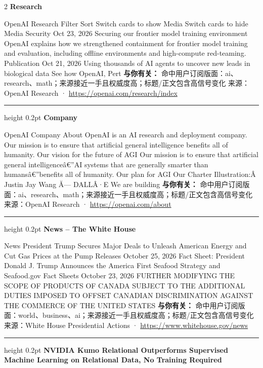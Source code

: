 \documentclass[10.5pt]{ctexart}
\begin{document}
\begin{multicols}{2}
{\large\bfseries Research}\par
OpenAI Research Filter Sort Switch cards to show Media Switch cards to hide Media Security Oct 23, 2026 Securing our frontier model training environment OpenAI explains how we strengthened containment for frontier model training and evaluation, including offline environments and high-compute red-teaming. Publication Oct 21, 2026 Using thousands of AI agents to uncover new leads in biological data See how OpenAI, Pert
\textbf{与你有关：} 命中用户订阅版面：ai、research、math；来源接近一手且权威度高；标题/正文包含高信号变化
{\footnotesize\color{ormuted} 来源：OpenAI Research · \url{https://openai.com/research/index}}
\vspace{2mm}
\hrule height 0.2pt
\vspace{2mm}
{\large\bfseries Company}\par
OpenAI Company About OpenAI is an AI research and deployment company. Our mission is to ensure that artificial general intelligence benefits all of humanity. Our vision for the future of AGI Our mission is to ensure that artificial general intelligenceâ€”AI systems that are generally smarter than humansâ€”benefits all of humanity. Our plan for AGI Our Charter Illustration:Â Justin Jay Wang Ă— DALLÂ·E We are building 
\textbf{与你有关：} 命中用户订阅版面：ai、research、math；来源接近一手且权威度高；标题/正文包含高信号变化
{\footnotesize\color{ormuted} 来源：OpenAI Research · \url{https://openai.com/about}}
\vspace{2mm}
\hrule height 0.2pt
\vspace{2mm}
{\large\bfseries News – The White House}\par
News President Trump Secures Major Deals to Unleash American Energy and Cut Gas Prices at the Pump Releases October 25, 2026 Fact Sheet: President Donald J. Trump Announces the America First Seafood Strategy and Seafood.gov Fact Sheets October 23, 2026 FURTHER MODIFYING THE SCOPE OF PRODUCTS OF CANADA SUBJECT TO THE ADDITIONAL DUTIES IMPOSED TO OFFSET CANADIAN DISCRIMINATION AGAINST THE COMMERCE OF THE UNITED STATES 
\textbf{与你有关：} 命中用户订阅版面：world、business、ai；来源接近一手且权威度高；标题/正文包含高信号变化
{\footnotesize\color{ormuted} 来源：White House Presidential Actions · \url{https://www.whitehouse.gov/news}}
\vspace{2mm}
\hrule height 0.2pt
\vspace{2mm}
{\large\bfseries NVIDIA Kumo Relational Outperforms Supervised Machine Learning on Relational Data, No Training Required}\par

\end{multicols}
\end{document}
